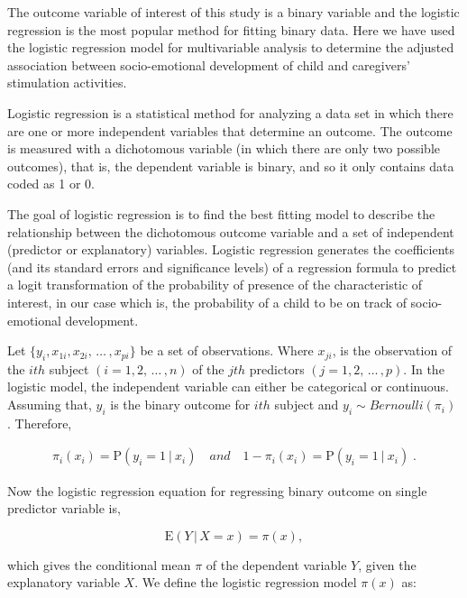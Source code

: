 \documentclass[
  12pt,
  oneside]{report}
\begin{document}
The outcome variable of interest of this study is a binary variable and the logistic regression is the most popular method for fitting binary data. Here we have used the logistic regression model for multivariable analysis to determine the adjusted association between socio-emotional development of child and caregivers' stimulation activities.

Logistic regression is a statistical method for analyzing a data set in which there
are one or more independent variables that determine an outcome. The outcome is
measured with a dichotomous variable (in which there are only two possible outcomes),
that is, the dependent variable is binary, and so it only contains data coded as 1 or 0.

The goal of logistic regression is to find the best fitting model to describe the relationship between the dichotomous outcome variable and a set of independent (predictor or explanatory) variables. Logistic regression generates the coefficients (and its standard errors and significance levels) of a regression formula to
predict a logit transformation of the probability of presence of the characteristic of interest, in our case which is, the probability of a child to be on track of socio-emotional development.

Let \(\{y_i, x_{1i}, x_{2i}, \, \dots \, , x_{pi}\}\) be a set of observations. Where \(x_{ji}\), is the observation of the \(ith\) subject \((i = 1, 2, \, \dots \, , n)\) of the \(jth\) predictors \((j = 1, 2, \, \dots \, , p)\). In the logistic model, the independent variable can either be categorical or continuous. Assuming that, \(y_i\) is the binary outcome for \(ith\) subject and \(y_i \sim Bernoulli(\pi_i)\) . Therefore,

\begin{align*}
\pi_i(x_i) = \mathrm{P}(y_i = 1 \: | \: x_i) \quad and \quad  1 - \pi_i(x_i) = \mathrm{P}(y_i = 1 \: | \: x_i) \; .
\end{align*}

Now the logistic regression equation for regressing binary outcome on single predictor variable is,

\begin{equation*}
\mathrm{E}(Y \, | \, X = x) = \pi(x),
\end{equation*}

which gives the conditional mean \(\pi\) of the dependent variable \(Y\), given the explanatory variable \(X\). We define the logistic regression model \(\pi(x)\) as:
\end{document}
